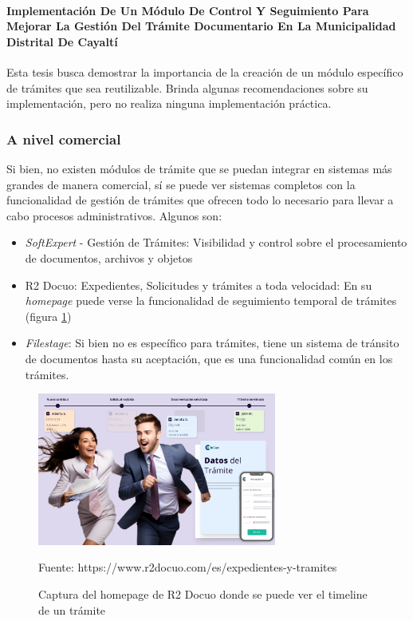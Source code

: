 \paragraph{Implementación De Un Módulo De Control Y Seguimiento Para Mejorar La Gestión Del Trámite Documentario En La Municipalidad Distrital De Cayaltí}

Esta tesis busca demostrar la importancia de la creación de un módulo específico de trámites que sea reutilizable. Brinda algunas recomendaciones sobre su implementación, pero no realiza ninguna implementación práctica.

\subsubsection{A nivel comercial}

Si bien, no existen módulos de trámite que se puedan integrar en sistemas más grandes de manera comercial, sí se puede ver sistemas completos con la funcionalidad de gestión de trámites que ofrecen todo lo necesario para llevar a cabo procesos administrativos. Algunos son:

\begin{itemize}
    \item \textit{SoftExpert} - Gestión de Trámites: Visibilidad y control sobre el procesamiento de documentos, archivos y objetos
    \item R2 Docuo: Expedientes, Solicitudes y trámites a toda velocidad: En su \textit{homepage} puede verse la funcionalidad de seguimiento temporal de trámites (figura \ref{fig:r2docuotimeline})
    \item \textit{Filestage}: Si bien no es específico para trámites, tiene un sistema de tránsito de documentos hasta su aceptación, que es una funcionalidad común en los trámites.
\end{itemize}

\begin{figure}[!h]
    \centering
    \includegraphics[width=0.7\textwidth]{assets/r2docuotimeline}
    \caption{Captura del homepage de R2 Docuo donde se puede ver el timeline de un trámite}{Fuente: https://www.r2docuo.com/es/expedientes-y-tramites}
    \label{fig:r2docuotimeline}
\end{figure}

